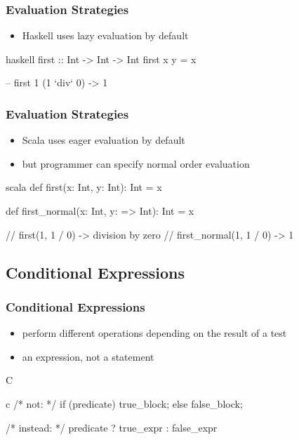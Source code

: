 \documentclass[dvipsnames]{beamer}
\theoremstyle{plain}
\begin{document}
\begin{frame}[fragile]
  \frametitle{Evaluation Strategies}

  \begin{itemize}
    \item Haskell uses lazy evaluation by default
  \end{itemize}

  \begin{example}[Haskell]
    \begin{pygments}{haskell}
first :: Int -> Int -> Int
first x y = x

-- first 1 (1 `div` 0) -> 1
    \end{pygments}
  \end{example}
\end{frame}

\begin{frame}[fragile]
  \frametitle{Evaluation Strategies}

  \begin{itemize}
    \item Scala uses eager evaluation by default
    \item but programmer can specify normal order evaluation
  \end{itemize}

  \begin{example}[Scala]
    \begin{pygments}{scala}
def first(x: Int, y: Int): Int = x

def first_normal(x: Int, y: => Int): Int = x

// first(1, 1 / 0) -> division by zero
// first_normal(1, 1 / 0) -> 1
    \end{pygments}
  \end{example}
\end{frame}

\subsection{Conditional Expressions}

\begin{frame}[fragile]
  \frametitle{Conditional Expressions}

  \begin{itemize}
    \item perform different operations depending on the result of a test
    \item an expression, not a statement
  \end{itemize}

  \pause
  \begin{block}{C}
    \begin{pygments}{c}
/* not: */
if (predicate)
    true_block;
else
    false_block;

/* instead: */
predicate ? true_expr : false_expr
    \end{pygments}
  \end{block}
\end{frame}
\end{document}
